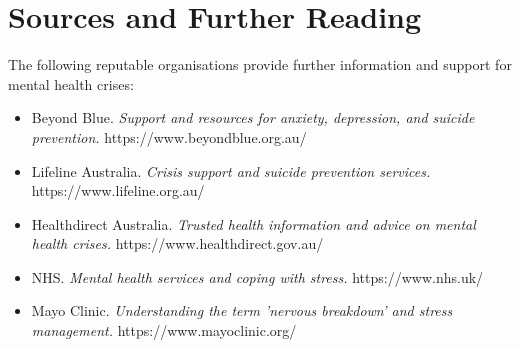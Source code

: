 \section*{Sources and Further Reading}
The following reputable organisations provide further information and support for mental health crises:
\begin{itemize}
    \item Beyond Blue. \textit{Support and resources for anxiety, depression, and suicide prevention.} https://www.beyondblue.org.au/
    \item Lifeline Australia. \textit{Crisis support and suicide prevention services.} https://www.lifeline.org.au/
    \item Healthdirect Australia. \textit{Trusted health information and advice on mental health crises.} https://www.healthdirect.gov.au/
    \item NHS. \textit{Mental health services and coping with stress.} https://www.nhs.uk/
    \item Mayo Clinic. \textit{Understanding the term 'nervous breakdown' and stress management.} https://www.mayoclinic.org/
\end{itemize}
